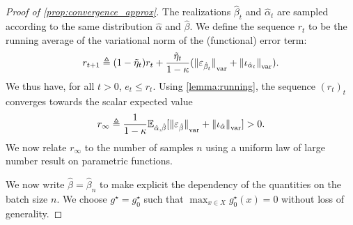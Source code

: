\begin{proof}[Proof of \autoref{prop:convergence_approx}]
The realizations $\hat \beta_t$ and $\hat \alpha_t$
are sampled according to the same distribution $\hat \alpha$ and $\hat \beta$. We
define the sequence $r_t$ to be the running average of the variational norm of the
(functional) error term:
\begin{equation}
    r_{t+1} \triangleq (1 - \tilde \eta_t) r_t + \frac{\tilde \eta_t}{1 - \kappa}
    ({\Vert \varepsilon_{\hat \beta_t} \Vert}_{\text{\upshape var}} + 
    {\Vert \iota_{\hat \alpha_t} \Vert}_{\text{\upshape var}}).
\end{equation}
We thus have, for all $t > 0$, $e_t \leq r_t$. Using \autoref{lemma:running}, the sequence $(r_t)_t$
converges towards the scalar expected value
\begin{equation}\label{eq:r_infty}
    r_\infty \triangleq \frac{1}{1 - \kappa} \mathbb{E}_{\hat \alpha, \hat \beta}[{\Vert \varepsilon_{\hat \beta} \Vert}_{\text{\upshape var}}
    + {\Vert \iota_{\hat \alpha} \Vert}_{\text{\upshape var}}] > 0.
\end{equation}
We now relate $r_\infty$ to the number of samples $n$ using
a uniform law of large number result on parametric functions.

We now write $\hat \beta = \hat \beta_n$ to make explicit the dependency of the
quantities on the batch size $n$. We choose $g^\star = g^\star_0$ such that
$\max_{x \in X} g^\star_0(x) = 0$ without loss of generality.


\end{proof}
